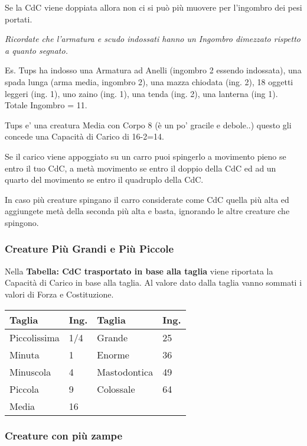 \documentclass[12pt,a4paper,twoside,openany]{book}
\begin{document}
\begin{multicols}{2}
Se la CdC viene doppiata allora non ci si può più muovere per l'ingombro dei pesi portati.

\textit{Ricordate che l'armatura e scudo indossati hanno un Ingombro dimezzato rispetto a quanto segnato.}

Es. Tups ha indosso una Armatura ad Anelli (ingombro 2 essendo indossata), una spada lunga (arma media, ingombro 2), una mazza chiodata (ing. 2), 18 oggetti leggeri (ing. 1), uno zaino (ing. 1), una tenda (ing. 2), una lanterna (ing 1). Totale Ingombro = 11.

Tups e' una creatura Media con Corpo 8 (è un po' gracile e debole..) questo gli concede una Capacità di Carico di 16-2=14.

Se il carico viene appoggiato su un carro puoi spingerlo a movimento pieno se entro il tuo CdC, a metà movimento se entro il doppio della CdC ed ad un quarto del movimento se entro il quadruplo della CdC.

In caso più creature spingano il carro considerate come CdC quella più alta ed aggiungete metà della seconda più alta e basta, ignorando le altre creature che spingono.

\subsubsection{Creature Più Grandi e Più Piccole}

Nella \textbf{Tabella: CdC trasportato in base alla taglia} viene riportata la Capacità di Carico in base alla taglia. Al valore dato dalla taglia vanno sommati i valori di Forza e Costituzione.

\medskip

\begin{tabularx}{0.45\textwidth}{ll|ll}
\textbf{Taglia}& \textbf{Ing.}&\textbf{Taglia} & \textbf{Ing.}\\
\toprule
Piccolissima &1/4& Grande & 25\\
Minuta & 1 & Enorme& 36\\
Minuscola & 4& Mastodontica&49\\
Piccola & 9 & Colossale&64\\
Media & 16&&\\
\end{tabularx}

\medskip

\subsubsection{Creature con più zampe}


\end{multicols}
\end{document}
